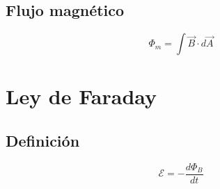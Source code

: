 \documentclass[a4, 12pt]{report}
\begin{document}
    \section*{Flujo magnético}

      \begin{equation*}
        \Phi_m=\int\vec{B}\cdot d\vec{A}
      \end{equation*}

  \chapter*{Ley de Faraday}

    \section*{Definición}

      \begin{equation*}
        \mathcal{E}=-\frac{d\Phi_B}{dt}
      \end{equation*}

    \section*{}
\end{document}
